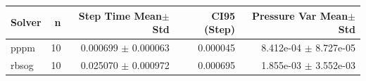 \begin{tabular}{lrrrr}
\toprule
Solver & n & Step Time Mean$\pm$Std & CI95 (Step) & Pressure Var Mean$\pm$Std \\
\midrule
pppm & 10 & 0.000699 $\pm$ 0.000063 & 0.000045 & 8.412e-04 $\pm$ 8.727e-05 \\
rbsog & 10 & 0.025070 $\pm$ 0.000972 & 0.000695 & 1.855e-03 $\pm$ 3.552e-03 \\
\bottomrule
\end{tabular}
